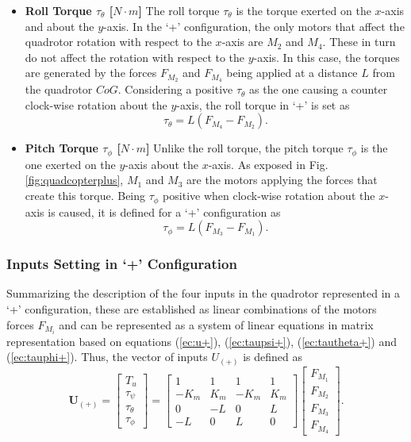 \begin{itemize}
\item \textbf{Roll Torque $\tau_{\theta}$ [$N\cdot m$]}
The roll torque $\tau_\theta$ is the torque exerted on the $x$-axis and about the $y$-axis. In the `+' configuration, the only motors that affect the quadrotor rotation with respect to the $x$-axis are $M_2$ and $M_4$. These in turn do not affect the rotation with respect to the $y$-axis. In this case, the torques are generated by the forces $F_{M_2}$ and $F_{M_4}$ being applied at a distance $L$ from the quadrotor $CoG$. Considering a positive $\tau_\theta$ as the one causing a counter clock-wise rotation about the $y$-axis, the roll torque in `+' is set as
\begin{equation}
\label{ec:tautheta+}
\tau_{\theta} = L(F_{M_4}-F_{M_2}).
\end{equation}

\item \textbf{Pitch Torque $\tau_{\phi}$ [$N\cdot m$]}
Unlike the roll torque, the pitch torque $\tau_\phi$ is the one exerted on the $y$-axis about the $x$-axis. As exposed in Fig. \ref{fig:quadcopterplus}, $M_1$ and $M_3$ are the motors applying the forces that create this torque. Being $\tau_\phi$ positive when clock-wise rotation about the $x$-axis is caused, it is defined for a `+' configuration as
\begin{equation}
\label{ec:tauphi+}
\tau_{\phi} = L(F_{M_3}-F_{M_1}).
\end{equation}
\end{itemize}

\subsubsection{Inputs Setting in `+' Configuration}
Summarizing the description of the four inputs in the quadrotor represented in a `+' configuration, these are established as linear combinations of the motors forces $F_{M_i}$ and can be represented as a system of linear equations in matrix representation based on equations (\ref{ec:u+}), (\ref{ec:taupsi+}), (\ref{ec:tautheta+}) and (\ref{ec:tauphi+}). Thus, the vector of inputs $U_{(+)}$ is defined as
\begin{equation}
	\mathbf{U_{(+)}} = \begin{bmatrix}
	T_u\\[5pt]
	\tau_{\psi}\\[5pt]
	\tau_{\theta}\\[5pt]
	\tau_{\phi}
	\end{bmatrix} = \begin{bmatrix}
	1 & 1 & 1 & 1 \\[5pt]
	-K_{m} & K_{m} & -K_{m} & K_{m}\\[5pt]
	0 & -L & 0 & L\\[5pt]
	-L & 0 & L & 0
							\end{bmatrix}
\begin{bmatrix}
F_{M_1}\\[5pt]
F_{M_2}\\[5pt]
F_{M_3}\\[5pt]
F_{M_4}
\end{bmatrix}.
	\label{ec:U_+}						
\end{equation}

